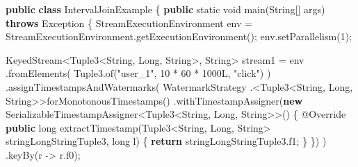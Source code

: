 \documentclass[cn,11pt,chinese]{elegantbook}
\newenvironment{Shaded}{}{}
\newcommand{\AttributeTok}[1]{\textcolor[rgb]{0.49,0.56,0.16}{#1}}
\newcommand{\BuiltInTok}[1]{#1}
\newcommand{\DataTypeTok}[1]{\textcolor[rgb]{0.56,0.13,0.00}{#1}}
\newcommand{\DecValTok}[1]{\textcolor[rgb]{0.25,0.63,0.44}{#1}}
\newcommand{\FunctionTok}[1]{\textcolor[rgb]{0.02,0.16,0.49}{#1}}
\newcommand{\KeywordTok}[1]{\textcolor[rgb]{0.00,0.44,0.13}{\textbf{#1}}}
\newcommand{\NormalTok}[1]{#1}
\newcommand{\StringTok}[1]{\textcolor[rgb]{0.25,0.44,0.63}{#1}}
\begin{document}
\begin{Shaded}
\begin{Highlighting}[]
\KeywordTok{public} \KeywordTok{class}\NormalTok{ IntervalJoinExample \{}
    \KeywordTok{public} \DataTypeTok{static} \DataTypeTok{void} \FunctionTok{main}\NormalTok{(}\BuiltInTok{String}\NormalTok{[] args) }\KeywordTok{throws} \BuiltInTok{Exception}\NormalTok{ \{}
\NormalTok{        StreamExecutionEnvironment env = StreamExecutionEnvironment.}\FunctionTok{getExecutionEnvironment}\NormalTok{();}
\NormalTok{        env.}\FunctionTok{setParallelism}\NormalTok{(}\DecValTok{1}\NormalTok{);}

\NormalTok{        KeyedStream\textless{}Tuple3\textless{}}\BuiltInTok{String}\NormalTok{, }\BuiltInTok{Long}\NormalTok{, }\BuiltInTok{String}\NormalTok{\textgreater{}, }\BuiltInTok{String}\NormalTok{\textgreater{} stream1 = env}
\NormalTok{            .}\FunctionTok{fromElements}\NormalTok{(}
\NormalTok{                Tuple3.}\FunctionTok{of}\NormalTok{(}\StringTok{"user\_1"}\NormalTok{, }\DecValTok{10}\NormalTok{ * }\DecValTok{60}\NormalTok{ * }\DecValTok{1000L}\NormalTok{, }\StringTok{"click"}\NormalTok{)}
\NormalTok{            )}
\NormalTok{            .}\FunctionTok{assignTimestampsAndWatermarks}\NormalTok{(}
\NormalTok{                WatermarkStrategy}
\NormalTok{                    .\textless{}Tuple3\textless{}}\BuiltInTok{String}\NormalTok{, }\BuiltInTok{Long}\NormalTok{, }\BuiltInTok{String}\NormalTok{\textgreater{}\textgreater{}}\FunctionTok{forMonotonousTimestamps}\NormalTok{()}
\NormalTok{                    .}\FunctionTok{withTimestampAssigner}\NormalTok{(}\KeywordTok{new}\NormalTok{ SerializableTimestampAssigner\textless{}Tuple3\textless{}}\BuiltInTok{String}\NormalTok{, }\BuiltInTok{Long}\NormalTok{, }\BuiltInTok{String}\NormalTok{\textgreater{}\textgreater{}() \{}
                        \AttributeTok{@Override}
                        \KeywordTok{public} \DataTypeTok{long} \FunctionTok{extractTimestamp}\NormalTok{(Tuple3\textless{}}\BuiltInTok{String}\NormalTok{, }\BuiltInTok{Long}\NormalTok{, }\BuiltInTok{String}\NormalTok{\textgreater{} stringLongStringTuple3, }\DataTypeTok{long}\NormalTok{ l) \{}
                            \KeywordTok{return}\NormalTok{ stringLongStringTuple3.}\FunctionTok{f1}\NormalTok{;}
\NormalTok{                        \}}
\NormalTok{                    \})}
\NormalTok{            )}
\NormalTok{            .}\FunctionTok{keyBy}\NormalTok{(r {-}\textgreater{} r.}\FunctionTok{f0}\NormalTok{);}


\end{Highlighting}
\end{Shaded}
\end{document}
